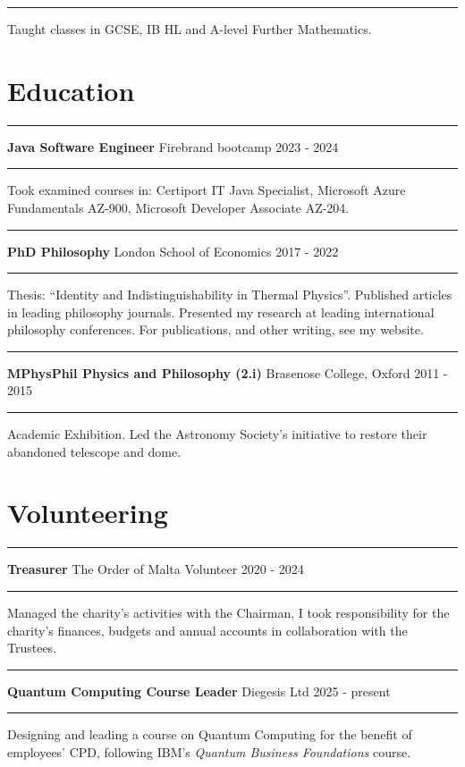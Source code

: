 \documentclass[
  11pt,
  a4paper,
]{article}
\begin{document}
\noindent\rule{\textwidth}{0.4pt}

Taught classes in GCSE, IB HL and A-level Further Mathematics.

\section{Education}\label{education}

\noindent\rule{\textwidth}{0.4pt}

\textbf{Java Software Engineer} \textbar{} Firebrand bootcamp \textbar{}
2023 - 2024

\noindent\rule{\textwidth}{0.4pt}

Took examined courses in: Certiport IT Java Specialist, Microsoft Azure
Fundamentals AZ-900, Microsoft Developer Associate AZ-204.

\noindent\rule{\textwidth}{0.4pt}

\textbf{PhD Philosophy} \textbar{} London School of Economics \textbar{}
2017 - 2022

\noindent\rule{\textwidth}{0.4pt}

Thesis: ``Identity and Indistinguishability in Thermal Physics''.
Published articles in leading philosophy journals. Presented my research
at leading international philosophy conferences. For publications, and
other writing, see my website.

\noindent\rule{\textwidth}{0.4pt}

\textbf{MPhysPhil Physics and Philosophy (2.i)} \textbar{} Brasenose
College, Oxford \textbar{} 2011 - 2015

\noindent\rule{\textwidth}{0.4pt}

Academic Exhibition. Led the Astronomy Society's initiative to restore
their abandoned telescope and dome.

\section{Volunteering}\label{volunteering}

\noindent\rule{\textwidth}{0.4pt}

\textbf{Treasurer} \textbar{} The Order of Malta Volunteer \textbar{}
2020 - 2024

\noindent\rule{\textwidth}{0.4pt}

Managed the charity's activities with the Chairman, I took
responsibility for the charity's finances, budgets and annual accounts
in collaboration with the Trustees.

\noindent\rule{\textwidth}{0.4pt}

\textbf{Quantum Computing Course Leader} \textbar{} Diegesis Ltd
\textbar{} 2025 - present

\noindent\rule{\textwidth}{0.4pt}

Designing and leading a course on Quantum Computing for the benefit of
employees' CPD, following IBM's \emph{Quantum Business Foundations}
course.
\end{document}
